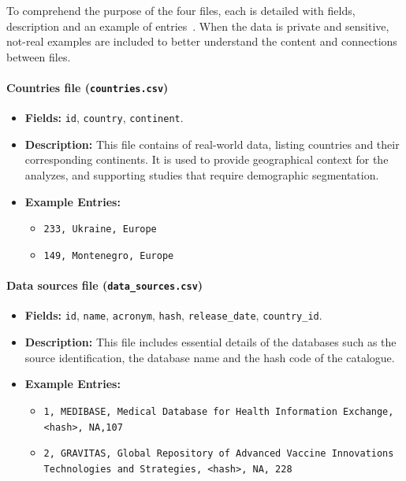 To comprehend the purpose of the four files, each is detailed with fields, description and an example of entries~\cite{almeida2024healthdbfinder}. When the data is private and sensitive, not-real examples are included to better understand the content and connections between files.

\paragraph{Countries file {\small\normalfont(\texttt{countries.csv})}}

\begin{itemize}
    \item \textbf{Fields:} \texttt{id}, \texttt{country}, \texttt{continent}.
    \item \textbf{Description:} This file contains of real-world data, listing countries and their corresponding continents. It is used to provide geographical context for the analyzes, and supporting studies that require demographic segmentation.
    \item \textbf{Example Entries:}
    \begin{itemize}
        \item \texttt{233, Ukraine, Europe}
        \item \texttt{149, Montenegro, Europe}
    \end{itemize}
\end{itemize}


\paragraph{Data sources file {\small\normalfont(\texttt{data\_sources.csv})}}

\begin{itemize}
    \item {\raggedright\textbf{Fields:} \texttt{id}, \texttt{name}, \texttt{acronym}, \texttt{hash}, \texttt{release\_date}, \texttt{country\_id}.\par}
    \item \textbf{Description:} This file includes essential details of the databases such as the source identification, the database name and the hash code of the {\ehden} catalogue.
    \item \textbf{Example Entries:}
    \begin{itemize}
        \item \texttt{1, MEDIBASE, Medical Database for Health Information Exchange, <hash>, NA,107}
        \item \texttt{2, GRAVITAS, Global Repository of Advanced Vaccine Innovations Technologies and Strategies, <hash>, NA, 228}
    \end{itemize}
\end{itemize}

